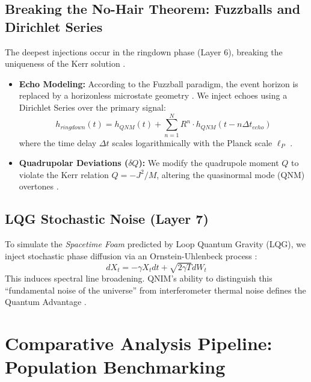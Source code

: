 \documentclass[11pt,a4paper,spanish]{book}
\numberwithin{equation}{chapter}
\numberwithin{figure}{chapter}
\numberwithin{equation}{chapter}
\numberwithin{figure}{chapter}
\numberwithin{table}{chapter}
\begin{document}
\subsection{Breaking the No-Hair Theorem: Fuzzballs and Dirichlet Series}

The deepest injections occur in the ringdown phase (Layer 6), breaking the uniqueness of the Kerr solution \cite{advancedsciencenews_fuzzballs, fuzzball_faq}.
\begin{itemize}
    \item \textbf{Echo Modeling:} According to the Fuzzball paradigm, the event horizon is replaced by a horizonless microstate geometry \cite{en_wikipedia_fuzzball, arxiv_fuzzballs_observations}. We inject echoes using a Dirichlet Series over the primary signal:
    \begin{equation}
        h_{ringdown}(t) = h_{QNM}(t) + \sum_{n=1}^{N} R^n \cdot h_{QNM}(t - n\Delta t_{echo})
    \end{equation}
    where the time delay $\Delta t$ scales logarithmically with the Planck scale $\ell_P$ \cite{arxiv_echoes_quantization, researchgate_echology}.
    \item \textbf{Quadrupolar Deviations ($\delta Q$):} We modify the quadrupole moment $Q$ to violate the Kerr relation $Q = -J^2/M$, altering the quasinormal mode (QNM) overtones \cite{arxiv_overtones_blackholes}.
\end{itemize}

\subsection{LQG Stochastic Noise (Layer 7)}

To simulate the \textit{Spacetime Foam} predicted by Loop Quantum Gravity (LQG), we inject stochastic phase diffusion via an Ornstein-Uhlenbeck process \cite{planetmath_ou_process, wikipedia_ou_process}:
\begin{equation}
    dX_t = -\gamma X_t dt + \sqrt{2\gamma T} dW_t
\end{equation}
This induces spectral line broadening. QNIM's ability to distinguish this ``fundamental noise of the universe'' from interferometer thermal noise defines the Quantum Advantage \cite{arxiv_universality_decoherence}.

\section{Comparative Analysis Pipeline: Population Benchmarking}
\end{document}
